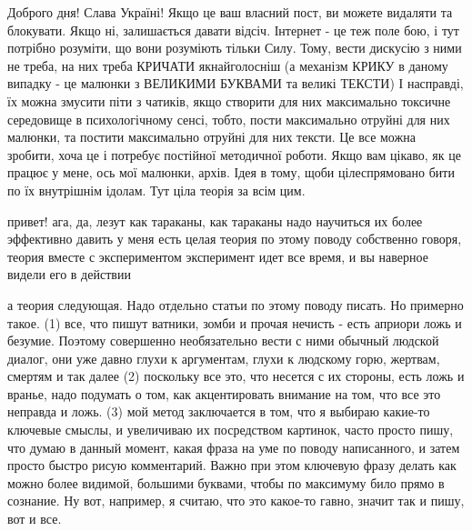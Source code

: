  
 
 
 
 



Доброго дня! Слава Україні! Якщо це ваш власний пост, ви можете видаляти та
блокувати. Якщо ні, залишається давати відсіч. Інтернет - це теж поле бою, і
тут потрібно розуміти, що вони розуміють тільки Силу. Тому, вести дискусію з
ними не треба, на них треба КРИЧАТИ якнайголосніш (а механізм КРИКУ в даному
випадку - це малюнки з ВЕЛИКИМИ БУКВАМИ та великі ТЕКСТИ) І насправді, їх можна
змусити піти з чатиків, якщо створити для них максимально токсичне середовище в
психологічному сенсі, тобто, пости максимально отруйні для них малюнки, та
постити максимально отруйні для них тексти. Це все можна зробити, хоча це і
потребує постійної методичної роботи. Якщо вам цікаво, як це працює у мене, ось
мої малюнки, архів. Ідея в тому, щоби цілеспрямовано бити по їх внутрішнім
ідолам. Тут ціла теорія за всім цим.

привет! ага, да, лезут как тараканы, как тараканы
надо научиться их более эффективно давить
у меня есть целая теория по этому поводу
собственно говоря, теория вместе с экспериментом
эксперимент идет все время, и вы наверное видели его в действии

а теория следующая. Надо отдельно статьи по этому поводу писать. Но примерно
такое. (1) все, что пишут ватники, зомби и прочая нечисть - есть априори ложь и
безумие. Поэтому совершенно необязательно вести с ними обычный людской диалог,
они уже давно глухи к аргументам, глухи к людскому горю, жертвам, смертям и так
далее (2) поскольку все это, что несется с их стороны, есть ложь и вранье, надо
подумать о том, как акцентировать внимание на том, что все это неправда и ложь.
(3) мой метод заключается в том, что я выбираю какие-то ключевые смыслы, и
увеличиваю их посредством картинок, часто просто пишу, что думаю в данный
момент, какая фраза на уме по поводу написанного, и затем просто быстро рисую
комментарий. Важно при этом ключевую фразу делать как можно более видимой,
большими буквами, чтобы по максимуму било прямо в сознание. Ну вот, например, я
считаю, что это какое-то гавно, значит так и пишу, вот и все.

